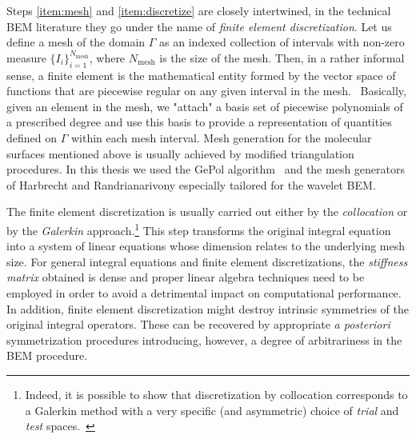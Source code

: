 Steps \ref{item:mesh} and \ref{item:discretize} are closely intertwined,
in the technical \acrshort{BEM} literature they go under the name of
\emph{finite element discretization}.
Let us define a mesh of the domain $\Gamma$ as an indexed collection of
intervals with non-zero measure $\lbrace I_i\rbrace_{i=1}^{N_\mathrm{mesh}}$, where
$N_\mathrm{mesh}$ is the size of the mesh.
Then, in a rather informal sense, a finite element is the
mathematical entity formed by the vector space of functions that are
piecewise regular on any given interval in the mesh.~\autocite{Ern2004-oo}
Basically, given an element in the mesh, we "attach" a basis set of
piecewise polynomials of a prescribed degree and use this basis to
provide a representation of quantities defined on $\Gamma$ within each
mesh interval.
Mesh generation for the molecular surfaces mentioned above is usually
achieved by modified triangulation procedures. In this thesis we used
the GePol algorithm~\autocite{Pascual-Ahuir1987-uo, Pascual-Ahuir1990-lp,
Pomelli1998-qp, Pomelli2001-sj, Frediani2004-ua, Pomelli2007-wq}
and the mesh generators of Harbrecht and Randrianarivony especially
tailored for the wavelet \acrshort{BEM}.~\autocite{Harbrecht2009-no,
Harbrecht2011-dk}

The finite element discretization is usually carried out either by the
\emph{collocation} or by the \emph{Galerkin} approach.\footnote{
Indeed, it is possible to show that discretization by collocation
corresponds to a Galerkin method with a very specific (and asymmetric)
choice of \emph{trial} and \emph{test}
spaces.~\autocite{Hackbusch1995-uq, Ern2004-oo}}
This step transforms the original integral equation into a system of
linear equations whose dimension relates to the underlying mesh size.
For general integral equations and finite element discretizations,
the \emph{stiffness matrix} obtained is dense and proper linear algebra
techniques need to be employed in order to avoid a detrimental impact on
computational performance.
In addition, finite element discretization might destroy intrinsic
symmetries of the original integral
operators. These can be recovered by appropriate \emph{a posteriori}
symmetrization procedures introducing, however, a degree of
arbitrariness in the \acrshort{BEM} procedure.~\autocite{Lange2011-eu}

